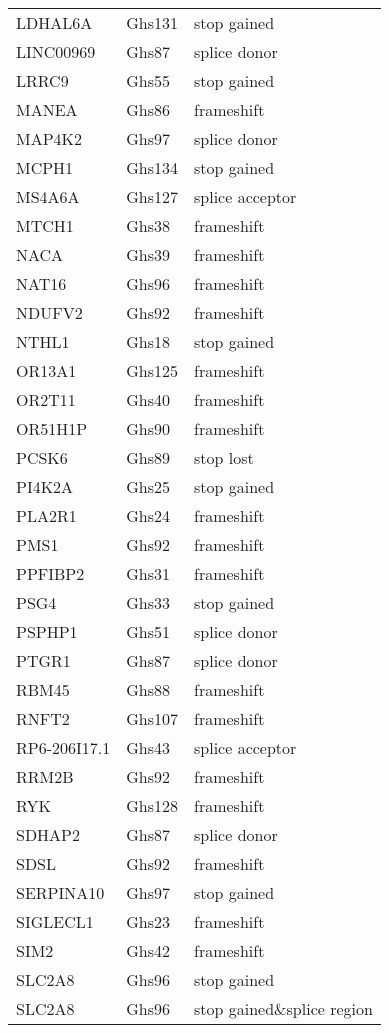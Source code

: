\documentclass[12pt,twoside]{reedthesis}
\theoremstyle{definition}
\theoremstyle{definition}
\theoremstyle{remark}
\begin{document}
\begin{longtable}[t]{lll}
  LDHAL6A & Ghs131 & stop gained\\
  \addlinespace
  LINC00969 & Ghs87 & splice donor\\
  LRRC9 & Ghs55 & stop gained\\
  MANEA & Ghs86 & frameshift\\
  MAP4K2 & Ghs97 & splice donor\\
  MCPH1 & Ghs134 & stop gained\\
  \addlinespace
  MS4A6A & Ghs127 & splice acceptor\\
  MTCH1 & Ghs38 & frameshift\\
  NACA & Ghs39 & frameshift\\
  NAT16 & Ghs96 & frameshift\\
  NDUFV2 & Ghs92 & frameshift\\
  \addlinespace
  NTHL1 & Ghs18 & stop gained\\
  OR13A1 & Ghs125 & frameshift\\
  OR2T11 & Ghs40 & frameshift\\
  OR51H1P & Ghs90 & frameshift\\
  PCSK6 & Ghs89 & stop lost\\
  \addlinespace
  PI4K2A & Ghs25 & stop gained\\
  PLA2R1 & Ghs24 & frameshift\\
  PMS1 & Ghs92 & frameshift\\
  PPFIBP2 & Ghs31 & frameshift\\
  PSG4 & Ghs33 & stop gained\\
  \addlinespace
  PSPHP1 & Ghs51 & splice donor\\
  PTGR1 & Ghs87 & splice donor\\
  RBM45 & Ghs88 & frameshift\\
  RNFT2 & Ghs107 & frameshift\\
  RP6-206I17.1 & Ghs43 & splice acceptor\\
  \addlinespace
  RRM2B & Ghs92 & frameshift\\
  RYK & Ghs128 & frameshift\\
  SDHAP2 & Ghs87 & splice donor\\
  SDSL & Ghs92 & frameshift\\
  SERPINA10 & Ghs97 & stop gained\\
  \addlinespace
  SIGLECL1 & Ghs23 & frameshift\\
  SIM2 & Ghs42 & frameshift\\
  SLC2A8 & Ghs96 & stop gained\\
  SLC2A8 & Ghs96 & stop gained\&splice region\\

\end{longtable}
\end{document}
